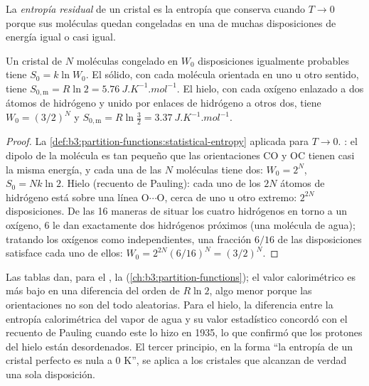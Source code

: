 \begin{definition}\label{def:b3:statistical-thermo-applied:residual-entropy}
La \emph{entropía residual} de un cristal es la entropía que
conserva cuando $T \to 0$ porque sus moléculas quedan congeladas en una de muchas
disposiciones de energía igual o casi igual.
\end{definition}

\begin{proposition}\label{prop:b3:statistical-thermo-applied:residual}
Un cristal de $N$ moléculas congelado en $W_0$ disposiciones igualmente probables tiene $S_0 =
k\ln W_0$. El  sólido, con cada molécula orientada en uno u otro sentido, tiene $S_{0,\mathrm m} = R\ln2 =
\qty{5.76}{J.K^{-1}.mol^{-1}}$. El hielo, con cada oxígeno enlazado a dos átomos de hidrógeno
y unido por enlaces de hidrógeno a otros dos, tiene $W_0 = (3/2)^N$ y $S_{0,\mathrm m} = R\ln\frac32 =
\qty{3.37}{J.K^{-1}.mol^{-1}}$.
\end{proposition}

\begin{proof}
La \cref{def:b3:partition-functions:statistical-entropy} aplicada para $T \to 0$.
: el dipolo de la molécula es tan pequeño que las orientaciones CO y OC
tienen casi la misma energía, y cada una de las $N$ moléculas tiene dos: $W_0 = 2^N$,
$S_0 = Nk\ln2$. Hielo (recuento de Pauling): cada uno de los $2N$ átomos de hidrógeno está sobre una
línea O$\cdots$O, cerca de uno u otro extremo: $2^{2N}$ disposiciones. De las 16 maneras de
situar los cuatro hidrógenos en torno a un oxígeno, 6 le dan exactamente dos hidrógenos
próximos (una molécula de agua); tratando los oxígenos como independientes, una fracción
$6/16$ de las disposiciones satisface cada uno de ellos: $W_0 = 2^{2N}(6/16)^N = (3/2)^N$.
\end{proof}

Las tablas dan, para el , la 
(\cref{ch:b3:partition-functions}); el valor calorimétrico es más bajo en una diferencia del
orden de $R\ln2$, algo menor porque las orientaciones no son del todo
aleatorias. Para el hielo, la diferencia entre la entropía calorimétrica del vapor de agua y
su valor estadístico concordó con el recuento de Pauling cuando este lo hizo en 1935,
lo que confirmó que los protones del hielo están desordenados. El tercer principio,
en la forma ``la entropía de un cristal perfecto es nula a 0 K'', se aplica a los
cristales que alcanzan de verdad una sola disposición.

